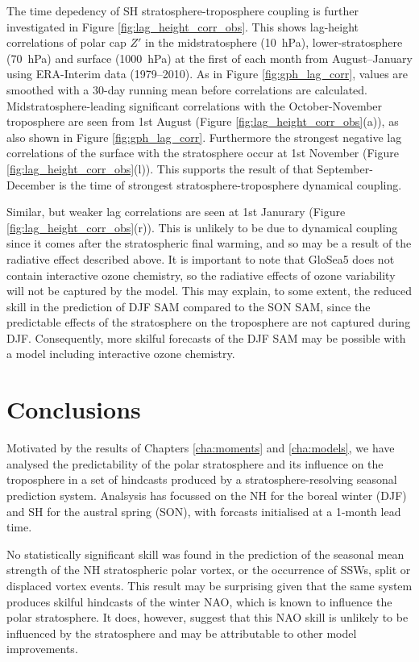 The time depedency of SH stratosphere-troposphere coupling is further
investigated in Figure \ref{fig:lag_height_corr_obs}. This shows lag-height
correlations of polar cap $Z'$ in the midstratosphere (10~hPa),
lower-stratosphere (70~hPa) and surface (1000~hPa) at the first of each month
from August--January using ERA-Interim data (1979--2010). As in Figure
\ref{fig:gph_lag_corr}, values are smoothed with a 30-day running mean before
correlations are calculated. Midstratosphere-leading significant correlations
with the October-November troposphere are seen from 1st August (Figure
\ref{fig:lag_height_corr_obs}(a)), as also shown in Figure
\ref{fig:gph_lag_corr}. Furthermore the strongest negative lag correlations of
the surface with the stratosphere occur at 1st November (Figure
\ref{fig:lag_height_corr_obs}(l)). This supports the result of
\citet{Shaw2010} that September-December is the time of strongest
stratosphere-troposphere dynamical coupling. 

Similar, but weaker lag correlations are seen at 1st Janurary (Figure
\ref{fig:lag_height_corr_obs}(r)). This is unlikely to be due to dynamical
coupling since it comes after the stratospheric final warming, and so may be a
result of the radiative effect described above. It is important to note that
GloSea5 does not contain interactive ozone chemistry, so the radiative effects
of ozone variability will not be captured by the model. This may explain, to
some extent, the reduced skill in the prediction of DJF SAM compared to the SON
SAM, since the predictable effects of the stratosphere on the troposphere are
not captured during DJF. Consequently, more skilful forecasts of the DJF SAM may
be possible with a model including interactive ozone chemistry. 



\section{Conclusions}
\label{sec:seas-conclusions}

Motivated by the results of Chapters \ref{cha:moments} and \ref{cha:models}, we
have analysed the predictability of the polar stratosphere and its influence on
the troposphere in a set of hindcasts produced by a stratosphere-resolving
seasonal prediction system. Analsysis has focussed on the NH for the boreal
winter (DJF) and SH for the austral spring (SON), with forcasts initialised at a
1-month lead time.

No statistically significant skill was found in the prediction of the seasonal
mean strength of the NH stratospheric polar vortex, or the occurrence of SSWs,
split or displaced vortex events. This result may be surprising given that the
same system produces skilful hindcasts of the winter NAO, which is known to
influence the polar stratosphere. It does, however, suggest that this NAO skill
is unlikely to be influenced by the stratosphere and may be attributable to
other model improvements.

